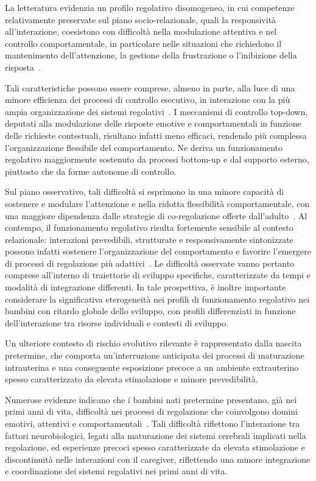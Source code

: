             La letteratura evidenzia un profilo regolativo disomogeneo, in cui competenze relativamente preservate sul piano socio-relazionale, quali la responsività all'interazione, coesistono con difficoltà nella modulazione attentiva e nel controllo comportamentale, in particolare nelle situazioni che richiedono il mantenimento dell'attenzione, la gestione della frustrazione o l'inibizione della risposta~\cite{fidler2009}.

            Tali caratteristiche possono essere comprese, almeno in parte, alla luce di una minore efficienza dei processi di controllo esecutivo, in interazione con la più ampia organizzazione dei sistemi regolativi~\cite{zelazo2020,lanfranchi2010}. I meccanismi di controllo top-down, deputati alla modulazione delle risposte emotive e comportamentali in funzione delle richieste contestuali, risultano infatti meno efficaci, rendendo più complessa l'organizzazione flessibile del comportamento. Ne deriva un funzionamento regolativo maggiormente sostenuto da processi bottom-up e dal supporto esterno, piuttosto che da forme autonome di controllo.

            Sul piano osservativo, tali difficoltà si esprimono in una minore capacità di sostenere e modulare l'attenzione e nella ridotta flessibilità comportamentale, con una maggiore dipendenza dalle strategie di co-regolazione offerte dall'adulto~\cite{calkins2007}. Al contempo, il funzionamento regolativo risulta fortemente sensibile al contesto relazionale: interazioni prevedibili, strutturate e responsivamente sintonizzate possono infatti sostenere l'organizzazione del comportamento e favorire l'emergere di processi di regolazione più adattivi~\cite{tronick2007}. Le difficoltà osservate vanno pertanto comprese all'interno di traiettorie di sviluppo specifiche, caratterizzate da tempi e modalità di integrazione differenti. In tale prospettiva, è inoltre importante considerare la significativa eterogeneità nei profili di funzionamento regolativo nei bambini con ritardo globale dello sviluppo, con profili differenziati in funzione dell'interazione tra risorse individuali e contesti di sviluppo.

            Un ulteriore contesto di rischio evolutivo rilevante è rappresentato dalla nascita pretermine, che comporta un'interruzione anticipata dei processi di maturazione intrauterina e una conseguente esposizione precoce a un ambiente extrauterino spesso caratterizzato da elevata stimolazione e minore prevedibilità.

            Numerose evidenze indicano che i bambini nati pretermine presentano, già nei primi anni di vita, difficoltà nei processi di regolazione che coinvolgono domini emotivi, attentivi e comportamentali~\cite{montagna2016}. Tali difficoltà riflettono l'interazione tra fattori neurobiologici, legati alla maturazione dei sistemi cerebrali implicati nella regolazione, ed esperienze precoci spesso caratterizzate da elevata stimolazione e discontinuità nelle interazioni con il caregiver, riflettendo una minore integrazione e coordinazione dei sistemi regolativi nei primi anni di vita.


